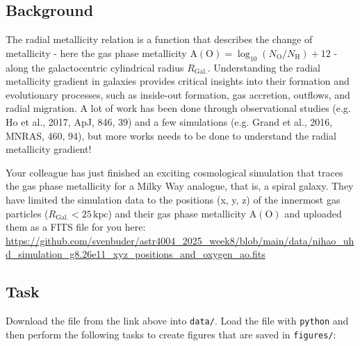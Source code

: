 \documentclass[a4paper,12pt]{article}
\begin{document}
\subsection{Background}

The radial metallicity relation is a function that describes the change of metallicity - here the gas phase metallicity $\mathrm{A(O)} = \log_{10}(N_\mathrm{O}/N_\mathrm{H}) + 12$ - along the galactocentric cylindrical radius $R_\mathrm{Gal.}$. Understanding the radial metallicity gradient in galaxies provides critical insights into their formation and evolutionary processes, such as inside-out formation, gas accretion, outflows, and radial migration. A lot of work has been done through observational studies (e.g. Ho et al., 2017, ApJ, 846, 39) and a few simulations (e.g. Grand et al., 2016, MNRAS, 460, 94), but more works needs to be done to understand the radial metallicity gradient!

Your colleague has just finished an exciting cosmological simulation that traces the gas phase metallicity for a Milky Way analogue, that is, a spiral galaxy. They have limited the simulation data to the positions (x, y, z) of the innermost gas particles ($R_\mathrm{Gal.} < 25\,\mathrm{kpc}$) and their gas phase metallicity $\mathrm{A(O)}$ and uploaded them as a FITS file for you here: \url{https://github.com/svenbuder/astr4004_2025_week8/blob/main/data/nihao_uhd_simulation_g8.26e11_xyz_positions_and_oxygen_ao.fits}

\subsection{Task}

Download the file from the link above into \texttt{data/}. Load the file with \texttt{python} and then perform the following tasks to create figures that are saved in \texttt{figures/}:
\end{document}
